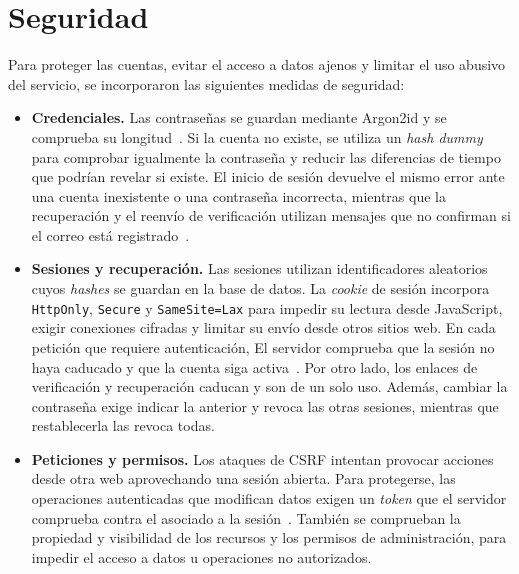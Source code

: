 \section{Seguridad}
\label{aspectos:seguridad}

Para proteger las cuentas, evitar el acceso a datos ajenos y limitar el uso
abusivo del servicio, se incorporaron las siguientes medidas de seguridad:

\begin{itemize}
    \item \textbf{Credenciales.} Las contraseñas se guardan mediante
    Argon2id y se comprueba su longitud~\cite{owasp_password_storage}.
    Si la cuenta no existe, se utiliza un \textit{hash dummy} para comprobar
    igualmente la contraseña y reducir las diferencias
    de tiempo que podrían revelar si existe. El inicio de sesión
    devuelve el mismo error ante una cuenta inexistente o una contraseña
    incorrecta, mientras
    que la recuperación y el reenvío de verificación utilizan mensajes
    que no confirman si el correo está registrado~\cite{owasp_authentication}.

    \item \textbf{Sesiones y recuperación.} Las sesiones utilizan
    identificadores aleatorios cuyos \textit{hashes} se guardan en la base
    de datos. La \textit{cookie} de sesión incorpora \texttt{HttpOnly},
    \texttt{Secure} y \texttt{SameSite=Lax} para impedir su lectura desde
    JavaScript, exigir conexiones cifradas y limitar su envío desde otros
    sitios web. En cada petición que requiere autenticación, El servidor
    comprueba que la sesión no haya caducado y que la cuenta
    siga activa~\cite{owasp_session_management}. Por otro lado, los enlaces de verificación
    y recuperación caducan y son de un solo uso. Además, cambiar la contraseña
    exige indicar la anterior y revoca las otras sesiones, mientras que
    restablecerla las revoca todas.

    \item \textbf{Peticiones y permisos.} Los ataques de \ac{CSRF} intentan
    provocar acciones desde otra web aprovechando una sesión abierta.
    Para protegerse, las operaciones autenticadas que modifican datos
    exigen un \textit{token} que el servidor comprueba contra el asociado
    a la sesión~\cite{owasp_csrf}. También se comprueban la propiedad y
    visibilidad de los recursos y los permisos de administración, para
    impedir el acceso a datos u operaciones no autorizados.


\end{itemize}
